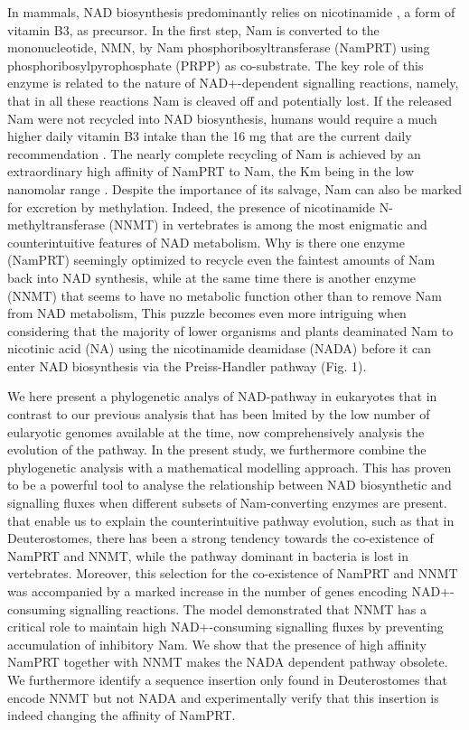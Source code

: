 In mammals, NAD biosynthesis predominantly relies on nicotinamide , a form of vitamin B3, as precursor. In the first step, Nam is converted to the mononucleotide, NMN, by Nam phosphoribosyltransferase (NamPRT) using phosphoribosylpyrophosphate (PRPP) as co-substrate. The key role of this enzyme is related to the nature of NAD+-dependent signalling reactions, namely, that in all these reactions Nam is cleaved off and potentially lost. If the released Nam were not recycled into NAD biosynthesis, humans would require a much higher daily vitamin B3 intake than the 16 mg that are the current daily recommendation \cite{CommissionofEuropeanCommunities2008}. The nearly complete recycling of Nam is achieved by an extraordinary high affinity of NamPRT to Nam, the Km being in the low nanomolar range \cite{Burgos2008}. Despite the importance of its salvage, Nam can also be marked for excretion by methylation. Indeed, the presence of nicotinamide N-methyltransferase (NNMT) in vertebrates \cite{Gossmann2012FEBS} is among the most enigmatic and counterintuitive features of NAD metabolism. Why is there one enzyme (NamPRT) seemingly optimized to recycle even the faintest amounts of Nam back into NAD synthesis, while at the same time there is another enzyme (NNMT) that seems to have no metabolic function other than to remove Nam from NAD metabolism, This puzzle becomes even more intriguing when considering that the majority of lower organisms and plants deaminated Nam to nicotinic acid (NA) using the nicotinamide deamidase (NADA) before it can enter NAD biosynthesis via the Preiss-Handler pathway (Fig. 1).

We here present a phylogenetic analys of NAD-pathway in eukaryotes that in contrast to our previous analysis that has been lmited by the low number of eularyotic genomes available at the time, now comprehensively analysis the evolution of the pathway. In the present study, we furthermore combine the phylogenetic analysis with a mathematical modelling approach. This has proven to be a powerful tool to analyse the relationship between NAD biosynthetic and signalling fluxes when different subsets of Nam-converting enzymes are present. that enable us to explain the counterintuitive pathway evolution, such as that in Deuterostomes, there has been a strong tendency towards the co-existence of NamPRT and NNMT, while the pathway dominant in bacteria is lost in vertebrates. Moreover, this selection for the co-existence of NamPRT and NNMT was accompanied by a marked increase in the number of genes encoding NAD+-consuming signalling reactions. The model demonstrated that NNMT has a critical role to maintain high NAD+-consuming signalling fluxes by preventing accumulation of inhibitory Nam. We show that the presence of high affinity NamPRT together with NNMT makes the NADA dependent pathway obsolete. We furthermore identify a sequence insertion only found in Deuterostomes that encode NNMT but not NADA and experimentally verify that this insertion is indeed changing the affinity of NamPRT.

